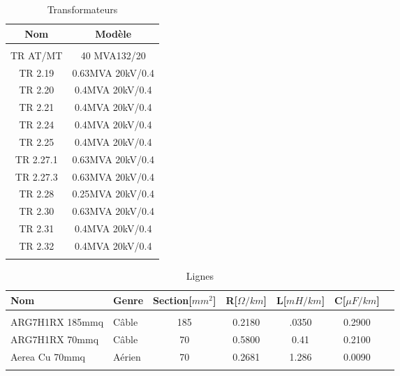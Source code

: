 \newcommand{\trafoi}{40 MVA132/20}
\newcommand{\trafoii}{0.25MVA 20kV/0.4}
\newcommand{\trafoiii}{0.4MVA 20kV/0.4}
\newcommand{\trafoiv}{0.63MVA 20kV/0.4}
\begin{table}[H]
	\captionsetup{justification=centering,margin=2cm}
	\caption{Transformateurs}
	\centering
	\begin{tabular}{cc}
		\hline
		Nom&Modèle\\
		\hline\\
		TR AT/MT&\trafoi\\
		TR 2.19&\trafoiv\\
		TR 2.20&\trafoiii\\
		TR 2.21&\trafoiii\\
		TR 2.24&\trafoiii\\
		TR 2.25&\trafoiii\\
		TR 2.27.1&\trafoiv\\
		TR 2.27.3&\trafoiv\\
		TR 2.28&\trafoii\\
		TR 2.30&\trafoiv\\
		TR 2.31&\trafoiii\\
		TR 2.32&\trafoiii\\
		\hline\\
	\end{tabular}
\end{table}	

\newcommand{\cablei}{ARG7H1RX 185mmq}
\newcommand{\cableii}{ARG7H1RX 70mmq}
\newcommand{\cableiii}{Aerea Cu 70mmq}

\begin{table}[H]
	\captionsetup{justification=centering,margin=2cm}
	\caption{Lignes}
	\centering
	\begin{tabular}{llccccc}
		\hline
		Nom&Genre&Section[$ mm^2 $]&R[$ \Omega/km $]&L[$ mH/km $]&C[$ \mu F/km $]\\
		\hline\\
		\cablei&Câble&185&0.2180&.0350&0.2900\\
		\cableii&Câble&70&0.5800&0.41&0.2100\\
		\cableiii&Aérien&70&0.2681&1.286&0.0090\\
		\hline\\
	\end{tabular}
\end{table}	



